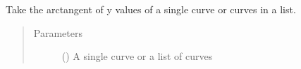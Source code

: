 \documentclass[letterpaper,10pt,english]{sphinxmanual}
\begin{document}
\begin{fulllineitems}
\label{\detokenize{pydv:pydvpy.atan}}
Take the arctangent of y values of a single curve or curves in a list.

\begin{sphinxVerbatim}[commandchars=\\\{\}]
  
\end{sphinxVerbatim}

\begin{sphinxVerbatim}[commandchars=\\\{\}]
\end{sphinxVerbatim}
\begin{quote}\begin{description}
\item[{Parameters}] \leavevmode
{} () \textendash{} A single curve or a list of curves

\end{description}\end{quote}

\end{fulllineitems}

\end{document}

